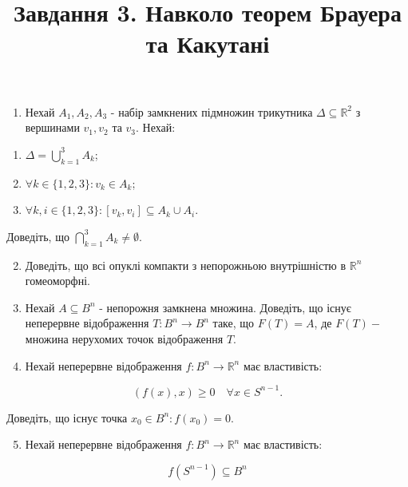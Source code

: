 \documentclass[10pt]{article}
\title{Завдання 3. Навколо теорем Брауера та Какутані }
\author{}
\date{}
\begin{document}
\maketitle
\begin{enumerate}
  \item Нехай $A_{1}, A_{2}, A_{3}$ - набір замкнених підмножин трикутника $\Delta \subseteq \mathbb{R}^{2}$ з вершинами $v_{1}, v_{2}$ та $v_{3}$. Нехай:
\end{enumerate}

\begin{enumerate}
  \item $\Delta=\bigcup_{k=1}^{3} A_{k}$;

  \item $\forall k \in\{1,2,3\}: v_{k} \in A_{k}$;

  \item $\forall k, i \in\{1,2,3\}:\left[v_{k}, v_{i}\right] \subseteq A_{k} \cup A_{i}$.

\end{enumerate}

Доведіть, що $\bigcap_{k=1}^{3} A_{k} \neq \emptyset$.

\begin{enumerate}
  \setcounter{enumi}{1}
  \item Доведіть, що всі опуклі компакти з непорожньою внутрішністю в $\mathbb{R}^{n}$ гомеоморфні.

  \item Нехай $A \subseteq B^{n}$ - непорожня замкнена множина. Доведіть, що існує неперервне відображення $T: B^{n} \rightarrow B^{n}$ таке, що $F(T)=A$, де $F(T)-$ множина нерухомих точок відображення $T$.

  \item Нехай неперервне відображення $f: B^{n} \rightarrow \mathbb{R}^{n}$ має властивість:

\end{enumerate}

$$
(f(x), x) \geq 0 \quad \forall x \in S^{n-1} .
$$

Доведіть, що існує точка $x_{0} \in B^{n}: f\left(x_{0}\right)=0$.

\begin{enumerate}
  \setcounter{enumi}{4}
  \item Нехай неперервне відображення $f: B^{n} \rightarrow \mathbb{R}^{n}$ має властивість:
\end{enumerate}

$$
f\left(S^{n-1}\right) \subseteq B^{n}
$$
\end{document}
